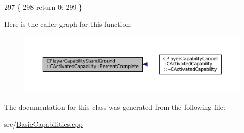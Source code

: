 \begin{DoxyCode}
297                                                                             \{
298     \textcolor{keywordflow}{return} 0;
299 \}
\end{DoxyCode}
Here is the caller graph for this function\+:\nopagebreak
\begin{figure}[H]
\begin{center}
\leavevmode
\includegraphics[width=350pt]{classCPlayerCapabilityStandGround_1_1CActivatedCapability_aa9bf1824e755460b699d81f866f2aadc_icgraph}
\end{center}
\end{figure}


The documentation for this class was generated from the following file\+:\begin{DoxyCompactItemize}
\item 
src/\hyperlink{BasicCapabilities_8cpp}{Basic\+Capabilities.\+cpp}\end{DoxyCompactItemize}
